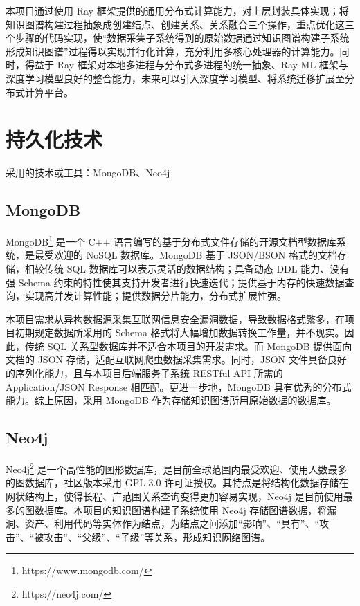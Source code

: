 \documentclass[a4paper,AutoFakeBold,oneside,12pt]{book}
\begin{document}
本项目通过使用 Ray 框架提供的通用分布式计算能力，对上层封装具体实现；将知识图谱构建过程抽象成创建结点、创建关系、关系融合三个操作，重点优化这三个步骤的代码实现，使“数据采集子系统得到的原始数据通过知识图谱构建子系统形成知识图谱”过程得以实现并行化计算，充分利用多核心处理器的计算能力。同时，得益于 Ray 框架对本地多进程与分布式多进程的统一抽象、Ray ML 框架与深度学习模型良好的整合能力，未来可以引入深度学习模型、将系统迁移扩展至分布式计算平台。

\section{持久化技术}

采用的技术或工具：MongoDB、Neo4j

\subsection{MongoDB}

MongoDB\footnote{https://www.mongodb.com/} 是一个 C++ 语言编写的基于分布式文件存储的开源文档型数据库系统，是最受欢迎的 NoSQL 数据库。MongoDB 基于 JSON/BSON 格式的文档存储，相较传统 SQL 数据库可以表示灵活的数据结构；具备动态 DDL 能力、没有强 Schema 约束的特性使其支持开发者进行快速迭代；提供基于内存的快速数据查询，实现高并发计算性能；提供数据分片能力，分布式扩展性强。

本项目需求从异构数据源采集互联网信息安全漏洞数据，导致数据格式繁多，在项目初期规定数据所采用的 Schema 格式将大幅增加数据转换工作量，并不现实。因此，传统 SQL 关系型数据库并不适合本项目的开发需求。而 MongoDB 提供面向文档的 JSON 存储，适配互联网爬虫数据采集需求。同时，JSON 文件具备良好的序列化能力，且与本项目后端服务子系统 RESTful API 所需的 Application/JSON Response 相匹配。更进一步地，MongoDB 具有优秀的分布式能力。综上原因，采用 MongoDB 作为存储知识图谱所用原始数据的数据库。

\subsection{Neo4j}

Neo4j\footnote{https://neo4j.com/} 是一个高性能的图形数据库，是目前全球范围内最受欢迎、使用人数最多的图数据库，社区版本采用 GPL-3.0 许可证授权。其特点是将结构化数据存储在网状结构上，使得长程、广范围关系查询变得更加容易实现，Neo4j 是目前使用最多的图数据库。本项目的知识图谱构建子系统使用 Neo4j 存储图谱数据，将漏洞、资产、利用代码等实体作为结点，为结点之间添加“影响”、“具有”、“攻击”、“被攻击”、“父级”、“子级”等关系，形成知识网络图谱。
\end{document}
